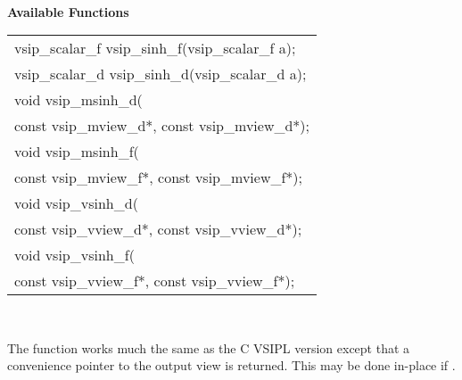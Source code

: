 \\\cvsiplh
\newline \hspace*{.8cm} \vspace*{.1cm} \textbf{Available Functions }
\newline \hspace*{1.1cm} {
\ttfamily
\begin{tabular}[H]{l}
vsip\_scalar\_f vsip\_sinh\_f(vsip\_scalar\_f a);\\
vsip\_scalar\_d vsip\_sinh\_d(vsip\_scalar\_d a);\\
void vsip\_msinh\_d(\\*
\hspace{1cm}const vsip\_mview\_d*, const vsip\_mview\_d*);\\
void vsip\_msinh\_f(\\*
\hspace{1cm}const vsip\_mview\_f*, const vsip\_mview\_f*);\\
void vsip\_vsinh\_d(\\*
\hspace{1cm}const vsip\_vview\_d*, const vsip\_vview\_d*);\\
void vsip\_vsinh\_f(\\*
\hspace{1cm}const vsip\_vview\_f*, const vsip\_vview\_f*);\\
\end{tabular}
}
\\\pyjvsiph
{}
\newline\hspace*{1.2cm}\parbox{10.8cm}{\vspace*{.1cm}The  function works much the same as the C VSIPL version except that a convenience pointer to the output view is returned. This may be done in-place if .}

